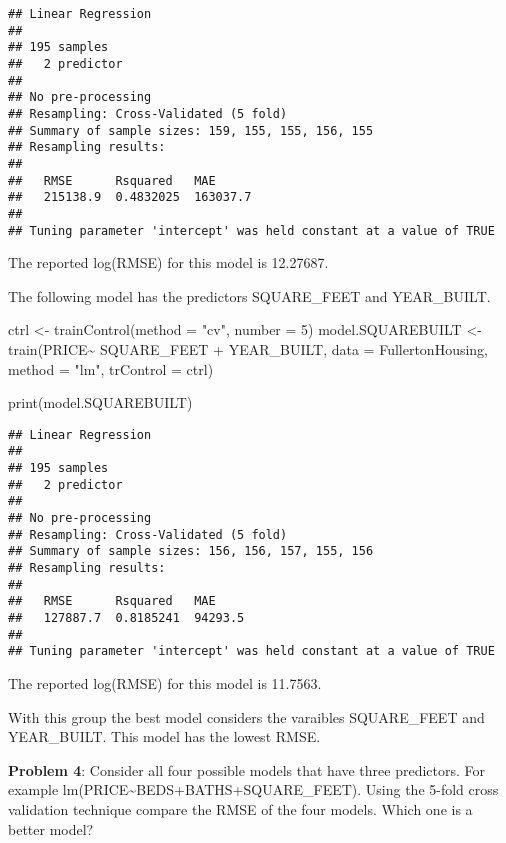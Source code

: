 \documentclass[
]{article}
\newenvironment{Shaded}{\begin{snugshade}}{\end{snugshade}}
\newcommand{\AttributeTok}[1]{\textcolor[rgb]{0.77,0.63,0.00}{#1}}
\newcommand{\DecValTok}[1]{\textcolor[rgb]{0.00,0.00,0.81}{#1}}
\newcommand{\FunctionTok}[1]{\textcolor[rgb]{0.00,0.00,0.00}{#1}}
\newcommand{\NormalTok}[1]{#1}
\newcommand{\OtherTok}[1]{\textcolor[rgb]{0.56,0.35,0.01}{#1}}
\newcommand{\SpecialCharTok}[1]{\textcolor[rgb]{0.00,0.00,0.00}{#1}}
\newcommand{\StringTok}[1]{\textcolor[rgb]{0.31,0.60,0.02}{#1}}
\begin{document}
\begin{verbatim}
## Linear Regression 
## 
## 195 samples
##   2 predictor
## 
## No pre-processing
## Resampling: Cross-Validated (5 fold) 
## Summary of sample sizes: 159, 155, 155, 156, 155 
## Resampling results:
## 
##   RMSE      Rsquared   MAE     
##   215138.9  0.4832025  163037.7
## 
## Tuning parameter 'intercept' was held constant at a value of TRUE
\end{verbatim}

The reported log(RMSE) for this model is 12.27687.

The following model has the predictors SQUARE\_FEET and YEAR\_BUILT.

\begin{Shaded}
\begin{Highlighting}[]
\NormalTok{ctrl }\OtherTok{\textless{}{-}} \FunctionTok{trainControl}\NormalTok{(}\AttributeTok{method =} \StringTok{"cv"}\NormalTok{, }\AttributeTok{number =} \DecValTok{5}\NormalTok{)}
\NormalTok{model.SQUAREBUILT }\OtherTok{\textless{}{-}} \FunctionTok{train}\NormalTok{(PRICE}\SpecialCharTok{\textasciitilde{}}\NormalTok{ SQUARE\_FEET }\SpecialCharTok{+}\NormalTok{ YEAR\_BUILT, }
               \AttributeTok{data =}\NormalTok{ FullertonHousing, }\AttributeTok{method =} \StringTok{"lm"}\NormalTok{, }\AttributeTok{trControl =}\NormalTok{ ctrl)}

\FunctionTok{print}\NormalTok{(model.SQUAREBUILT)}
\end{Highlighting}
\end{Shaded}

\begin{verbatim}
## Linear Regression 
## 
## 195 samples
##   2 predictor
## 
## No pre-processing
## Resampling: Cross-Validated (5 fold) 
## Summary of sample sizes: 156, 156, 157, 155, 156 
## Resampling results:
## 
##   RMSE      Rsquared   MAE    
##   127887.7  0.8185241  94293.5
## 
## Tuning parameter 'intercept' was held constant at a value of TRUE
\end{verbatim}

The reported log(RMSE) for this model is 11.7563.

With this group the best model considers the varaibles SQUARE\_FEET and
YEAR\_BUILT. This model has the lowest RMSE.

\textbf{Problem 4}: Consider all four possible models that have three
predictors. For example
lm(PRICE\textasciitilde BEDS+BATHS+SQUARE\_FEET). Using the 5-fold cross
validation technique compare the RMSE of the four models. Which one is a
better model?
\end{document}
